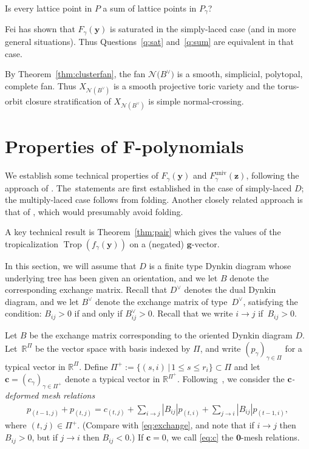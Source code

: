 \documentclass[10pt,a4paper]{amsart}
\def\R{{\mathbb R}}
\def\univ{{\operatorname{univ}}}
\def\z{{\mathbf z}}
\def\y{{\mathbf y}}
\def\N{{\mathcal{N}}}
\def\Trop{\operatorname{Trop}}
\def\g{{\mathbf g}}
\def\c{{\mathbf c}}
\numberwithin{equation}{section}
\begin{document}
\begin{question}\label{q:sum}
Is every lattice point in $P$ a sum of lattice points in $P_\gamma$?
\end{question}

Fei \cite{Fei} has shown that $F_\gamma(\y)$ is saturated in the simply-laced case (and in more general situations). Thus Questions~\ref{q:sat} and~\ref{q:sum} are equivalent in that case.

\bigskip{} %
By Theorem~\ref{thm:clusterfan}, the fan $\N\big(B^\vee\big)$ is a smooth, simplicial, polytopal, complete fan. Thus $X_{\N(B^\vee)}$ is a smooth projective toric variety and the torus-orbit closure stratification of $X_{\N(B^\vee)}$ is simple normal-crossing.


\section[Properties of F-polynomials]
{Properties of $\boldsymbol F$-polynomials}\label{sec:F}

We establish some technical properties of $F_\gamma(\y)$ and $F^\univ_\gamma(\z)$, following the approach of \cite{BDMTY}. The~statements are first established in the case of simply-laced $D$; the multiply-laced case follows from folding. Another closely related approach is that of \cite{PPPP}, which would presumably avoid folding.

A key technical result is Theorem~\ref{thm:pair} which gives the values of the tropicalization $\Trop(f_\gamma(\y))$ on a (negated) $\g$-vector.

In this section, we will assume that $D$ is a finite type Dynkin diagram whose underlying tree has been given an orientation, and we let $B$ denote the corresponding exchange matrix. Recall that $D^\vee$ denotes the dual Dynkin diagram, and we let $B^\vee$ denote the exchange matrix of type~$D^\vee$, satisfying the condition: $B_{ij} > 0$ if and only if $B^\vee_{ij} > 0$. Recall that we write $i \to j$ if~$B_{ij} > 0$.

\bigskip{}
Let $B$ be the exchange matrix corresponding to the oriented Dynkin diagram $D$. Let~$\R^\Pi$ be the vector space with basis indexed by $\Pi$, and write $(p_\gamma)_{\gamma \in \Pi}$ for a typical vector in $\R^\Pi$. Define $\Pi^+ :=\{(s,i) \,|\, 1\leq s \leq r_i\} \subset \Pi$ and let $\c = (c_\gamma)_{\gamma \in \Pi^+}$ denote a typical vector in $\R^{\Pi^+}$. Following~\cite{BDMTY}, we consider the \emph{$\c$-deformed mesh relations}
\begin{gather}\label{eq:c}
p_{(t-1,j)} + p_{(t,j)} = c_{(t,j)} + \sum_{i \to j} |B_{ij}| p_{(t,i)}+ \sum_{j \to i} |B_{ij}| p_{(t-1,i)},
\end{gather}
where $(t,j) \in \Pi^+$. (Compare with \eqref{eq:exchange}, and note that if $i \to j$ then $B_{ij} >0$, but if $j \to i$ then $B_{ij} < 0$.) If $\c = 0$, we call \eqref{eq:c} the ${\mathbf 0}$-mesh relations.
\end{document}
